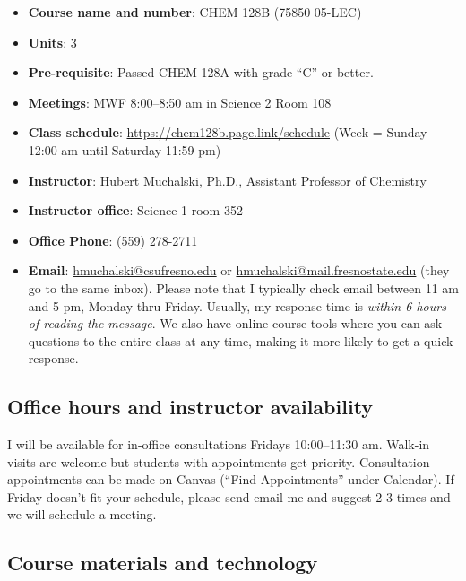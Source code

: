 \begin{itemize}
\tightlist
\item
  \textbf{Course name and number}: CHEM 128B (75850 05-LEC)
\item
  \textbf{Units}: 3
\item
  \textbf{Pre-requisite}: Passed CHEM 128A with grade ``C'' or better.
\item
  \textbf{Meetings}: MWF 8:00--8:50 am in Science 2 Room 108
\item
  \textbf{Class schedule}: \url{https://chem128b.page.link/schedule}
  (Week = Sunday 12:00 am until Saturday 11:59 pm)
\item
  \textbf{Instructor}: Hubert Muchalski, Ph.D., Assistant Professor of
  Chemistry
\item
  \textbf{Instructor office}: Science 1 room 352
\item
  \textbf{Office Phone}: (559) 278-2711
\item
  \textbf{Email}: \url{hmuchalski@csufresno.edu} or
  \url{hmuchalski@mail.fresnostate.edu} (they go to the same inbox).
  Please note that I typically check email between 11 am and 5 pm,
  Monday thru Friday. Usually, my response time is \emph{within 6 hours
  of reading the message}. We also have online course tools where you
  can ask questions to the entire class at any time, making it more
  likely to get a quick response.
\end{itemize}

\hypertarget{office-hours-and-instructor-availability}{%
\subsection{Office hours and instructor
availability}\label{office-hours-and-instructor-availability}}

I will be available for in-office consultations Fridays 10:00--11:30 am.
Walk-in visits are welcome but students with appointments get priority.
Consultation appointments can be made on Canvas (``Find Appointments''
under Calendar). If Friday doesn't fit your schedule, please send email
me and suggest 2-3 times and we will schedule a meeting.

\hypertarget{course-materials-and-technology}{%
\subsection{Course materials and
technology}\label{course-materials-and-technology}}

